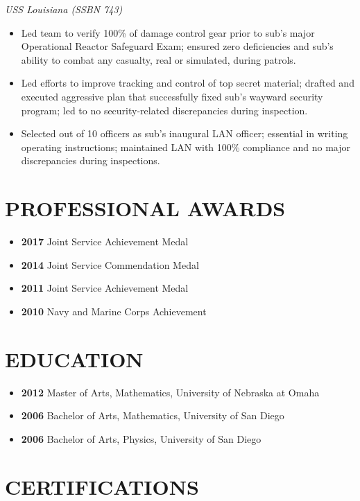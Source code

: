 \documentclass[10pt]{article}
\def\tightlist{}
\begin{document}
\emph{USS Louisiana (SSBN 743)}

\begin{itemize}
\tightlist
\item
  Led team to verify 100\% of damage control gear prior to sub's major
  Operational Reactor Safeguard Exam; ensured zero deficiencies and
  sub's ability to combat any casualty, real or simulated, during
  patrols.
\item
  Led efforts to improve tracking and control of top secret material;
  drafted and executed aggressive plan that successfully fixed sub's
  wayward security program; led to no security-related discrepancies
  during inspection.
\item
  Selected out of 10 officers as sub's inaugural LAN officer; essential
  in writing operating instructions; maintained LAN with 100\%
  compliance and no major discrepancies during inspections.
\end{itemize}

\section{PROFESSIONAL AWARDS}\label{professional-awards}

\begin{itemize}
\tightlist
\item
  \textbf{2017} Joint Service Achievement Medal
\item
  \textbf{2014} Joint Service Commendation Medal
\item
  \textbf{2011} Joint Service Achievement Medal
\item
  \textbf{2010} Navy and Marine Corps Achievement
\end{itemize}

\section{EDUCATION}\label{education}

\begin{itemize}
\tightlist
\item
  \textbf{2012} Master of Arts, Mathematics, University of Nebraska at
  Omaha
\item
  \textbf{2006} Bachelor of Arts, Mathematics, University of San Diego
\item
  \textbf{2006} Bachelor of Arts, Physics, University of San Diego
\end{itemize}

\section{CERTIFICATIONS}\label{certifications}
\end{document}
